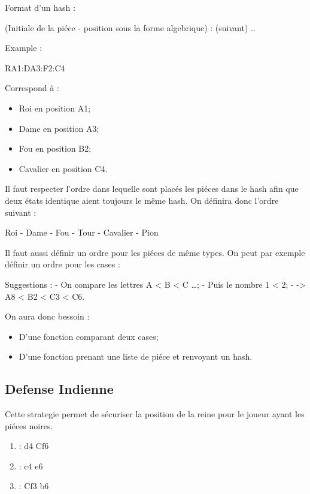 \documentclass[12pt]{article}
\begin{document}
Format d'un hash :

(Initiale de la piéce - position sous la forme algebrique) : (suivant)
..

Example :

RA1:DA3:F2:C4

Correspond à :

\begin{itemize}
\itemsep1pt\parskip0pt
\item
  Roi en position A1;
\item
  Dame en position A3;
\item
  Fou en position B2;
\item
  Cavalier en position C4.
\end{itemize}

Il faut respecter l'ordre dans lequelle sont placés les piéces dans le
hash afin que deux états identique aient toujours le même hash. On
définira donc l'ordre suivant :

Roi - Dame - Fou - Tour - Cavalier - Pion

Il faut aussi définir un ordre pour les piéces de même types. On peut
par exemple définir un ordre pour les cases :

Suggestions : - On compare les lettres A \textless{} B \textless{} C
\ldots{}; - Puis le nombre 1 \textless{} 2; - -\textgreater{} A8
\textless{} B2 \textless{} C3 \textless{} C6.

On aura donc bessoin :

\begin{itemize}
\itemsep1pt\parskip0pt
\item
  D'une fonction comparant deux cases;
\item
  D'une fonction prenant une liste de piéce et renvoyant un hash.
\end{itemize}

\subsection{Defense Indienne}\label{defense-indienne}

Cette strategie permet de sécuriser la position de la reine pour le
joueur ayant les piéces noires.

\begin{enumerate}
\def\labelenumi{\arabic{enumi}.}
\itemsep1pt\parskip0pt
\item
  : d4 Cf6
\item
  : c4 e6
\item
  : Cf3 b6
\end{enumerate}
\end{document}
